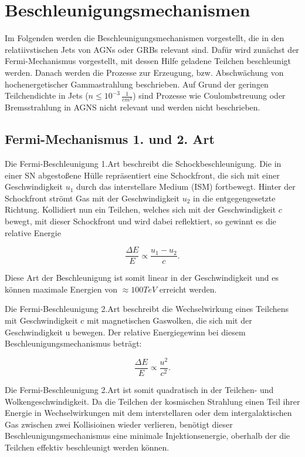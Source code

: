 \section{Beschleunigungsmechanismen} 
\label{sec:Beschleunigungsmechanismen}
Im Folgenden werden die Beschleunigungsmechanismen vorgestellt, die in den relatiivstischen Jets von AGNs oder GRBs relevant sind.
Dafür wird zunächst der Fermi-Mechanismus vorgestellt, mit dessen Hilfe geladene Teilchen beschleunigt werden.
Danach werden die Prozesse zur Erzeugung, bzw. Abschwächung von hochenergetischer Gammastrahlung beschrieben.
Auf Grund der geringen Teilchendichte in Jets ($n\leq 10^{-3}\,\frac{1}{cm^3}$) sind Prozesse wie Coulombstreuung oder Bremsstrahlung in AGNS nicht relevant und werden nicht beschrieben.

\subsection{Fermi-Mechanismus 1. und 2. Art}
Die Fermi-Beschleunigung 1.Art beschreibt die Schockbeschleunigung.
Die in einer SN abgestoßene Hülle repräsentiert eine Schockfront, die sich mit einer Geschwindigkeit $u_1$ durch das interstellare Medium (ISM) fortbewegt. 
Hinter der Schockfront strömt Gas mit der Geschwindigkeit $u_2$ in die entgegengesetzte Richtung.
Kollidiert nun ein Teilchen, welches sich mit der Geschwindigkeit $c$ bewegt, mit dieser Schockfront und wird dabei reflektiert, so gewinnt es die relative Energie

\begin{equation}
 \frac{\Delta E}{E}\propto \frac{u_1-u_2}{c}.
\end{equation}

Diese Art der Beschleunigung ist somit linear in der Geschwindigkeit und es können maximale Energien von $\approx 100\si{TeV}$ erreicht werden.\cite{Grupen}\cite{Longair}

Die Fermi-Beschleunigung 2.Art beschreibt die Wechselwirkung eines Teilchens mit Geschwindigkeit c mit magnetischen Gaswolken, die sich mit der Geschwindigkeit u bewegen.
Der relative Energiegewinn bei diesem Beschleunigungsmechanismus beträgt:

\begin{equation}
 \frac{\Delta E}{E}\propto \frac{u^2}{c^2}.
\end{equation}

Die Fermi-Beschleunigung 2.Art ist somit quadratisch in der Teilchen- und Wolkengeschwindigkeit.
Da die Teilchen der kosmischen Strahlung einen Teil ihrer Energie in Wechselwirkungen mit dem interstellaren oder dem intergalaktischen Gas zwischen zwei Kollisioinen wieder verlieren, benötigt dieser Beschleunigungsmechanismus eine minimale Injektionsenergie, oberhalb der die Teilchen effektiv beschleunigt werden können.\cite{Grupen}\cite{Longair}


